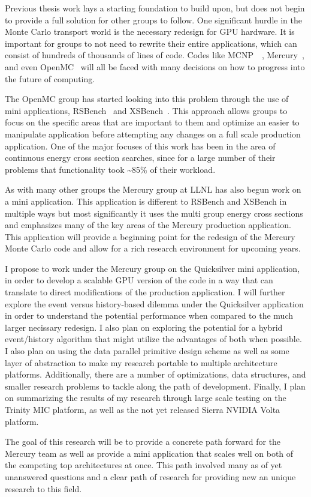 Previous thesis work lays a starting foundation to build upon, but does not begin to provide a full solution for other groups to follow.
%
One significant hurdle in the Monte Carlo transport world is the necessary redesign for GPU hardware.
%
It is important for groups to not need to rewrite their entire applications, which can consist of hundreds of thousands of lines of code.
%
Codes like MCNP~\cite{goorley2012initial}~\cite{padovani2012mcnpx}, Mercury~\cite{brantley2013recent}, and even OpenMC~\cite{romano2015openmc}
will all be faced with many decisions on how to progress into the future of computing.

The OpenMC group has started looking into this problem through the use of mini applications, RSBench~\cite{tramm2014performance} and XSBench~\cite{tramm2014xsbench}. 
%
This approach allows groups to focus on the specific areas that are important to them and optimize an easier to manipulate application before attempting any changes on a full scale production application.
%
One of the major focuses of this work has been in the area of continuous energy cross section searches, since for a large number of their problems that functionality took \textasciitilde85\% of their workload.

As with many other groups the Mercury group at LLNL has also begun work on a mini application.
%
This application is different to RSBench and XSBench in multiple ways but most significantly it uses the multi group energy cross sections and emphasizes  many of the key areas of the Mercury production application.
%
This application will provide a beginning point for the redesign of the Mercury Monte Carlo code and allow for a rich research environment for upcoming years.
%

I propose to work under the Mercury group on the Quicksilver mini application, in order to develop a scalable GPU version of the code in a way that can translate to direct modifications of the production application.
%
I will further explore the event versus history-based dilemma under the Quicksilver application in order to understand the potential performance when compared to the much larger necissary redesign.
%
I also plan on exploring the potential for a hybrid event/history algorithm that might utilize the advantages of both when possible.
%
I also plan on using the data parallel primitive design scheme as well as some layer of abstraction to make my research portable to multiple architecture platforms.
%
Additionally, there are a number of optimizations, data structures, and smaller research problems to tackle along the path of development.
%
Finally, I plan on summarizing the results of my research through large scale testing on the Trinity MIC platform, as well as the not yet released Sierra NVIDIA Volta platform.

The goal of this research will be to provide a concrete path forward for the Mercury team as well as provide a mini application that scales well on both of the competing top architectures at once.
%
This path involved many as of yet unanswered questions and a clear path of research for providing new an unique research to this field.





